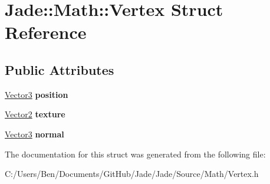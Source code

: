 \hypertarget{struct_jade_1_1_math_1_1_vertex}{}\section{Jade\+:\+:Math\+:\+:Vertex Struct Reference}
\label{struct_jade_1_1_math_1_1_vertex}
\subsection*{Public Attributes}
\begin{DoxyCompactItemize}
\item 
\hypertarget{struct_jade_1_1_math_1_1_vertex_a0dcd581ed4b39170c9bc8ab401c45cf1}{}\hyperlink{struct_jade_1_1_math_1_1_vector3}{Vector3} {\bfseries position}\label{struct_jade_1_1_math_1_1_vertex_a0dcd581ed4b39170c9bc8ab401c45cf1}

\item 
\hypertarget{struct_jade_1_1_math_1_1_vertex_a3bb1ba0bbe53216aee9bd01704e22dba}{}\hyperlink{struct_jade_1_1_math_1_1_vector2}{Vector2} {\bfseries texture}\label{struct_jade_1_1_math_1_1_vertex_a3bb1ba0bbe53216aee9bd01704e22dba}

\item 
\hypertarget{struct_jade_1_1_math_1_1_vertex_a1fbe2d046b5b4f3b7f03e72838888294}{}\hyperlink{struct_jade_1_1_math_1_1_vector3}{Vector3} {\bfseries normal}\label{struct_jade_1_1_math_1_1_vertex_a1fbe2d046b5b4f3b7f03e72838888294}

\end{DoxyCompactItemize}


The documentation for this struct was generated from the following file\+:\begin{DoxyCompactItemize}
\item 
C\+:/\+Users/\+Ben/\+Documents/\+Git\+Hub/\+Jade/\+Jade/\+Source/\+Math/Vertex.\+h\end{DoxyCompactItemize}
